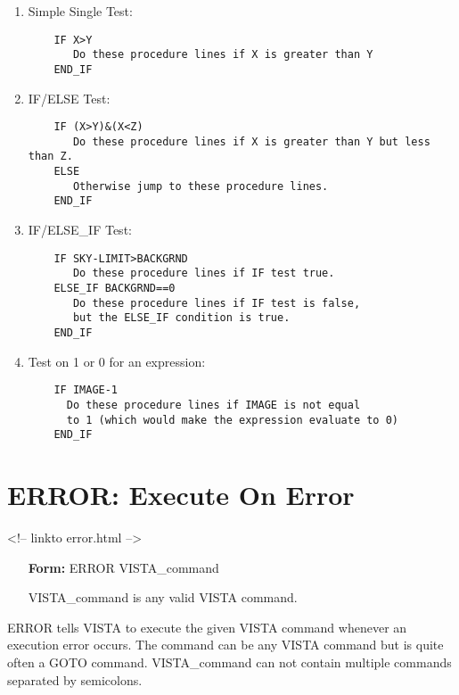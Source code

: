 \begin{enumerate}
  \item Simple Single Test:
  \begin{verbatim}
    IF X>Y
       Do these procedure lines if X is greater than Y
    END_IF
  \end{verbatim}

  \item IF/ELSE Test:
  \begin{verbatim}
    IF (X>Y)&(X<Z)
       Do these procedure lines if X is greater than Y but less than Z.
    ELSE
       Otherwise jump to these procedure lines.
    END_IF
  \end{verbatim}

  \item IF/ELSE\_IF Test:
  \begin{verbatim}
    IF SKY-LIMIT>BACKGRND
       Do these procedure lines if IF test true.
    ELSE_IF BACKGRND==0
       Do these procedure lines if IF test is false, 
       but the ELSE_IF condition is true.
    END_IF
  \end{verbatim}

  \item Test on 1 or 0 for an expression:
  \begin{verbatim}
    IF IMAGE-1
      Do these procedure lines if IMAGE is not equal
      to 1 (which would make the expression evaluate to 0)
    END_IF
  \end{verbatim}

\end{enumerate}

\section{ERROR: Execute On Error}
\begin{rawhtml}
<!-- linkto error.html -->
\end{rawhtml}

\begin{itemize}
  \item[\textbf{Form: } ERROR  VISTA\_command\hfill]{}
  \item[VISTA\_command]{is any valid VISTA command.}
\end{itemize}
ERROR tells VISTA to execute the given VISTA command whenever an execution
error occurs.  The command can be any VISTA command but is quite often a
GOTO command.  VISTA\_command can not contain multiple commands separated
by semicolons.

